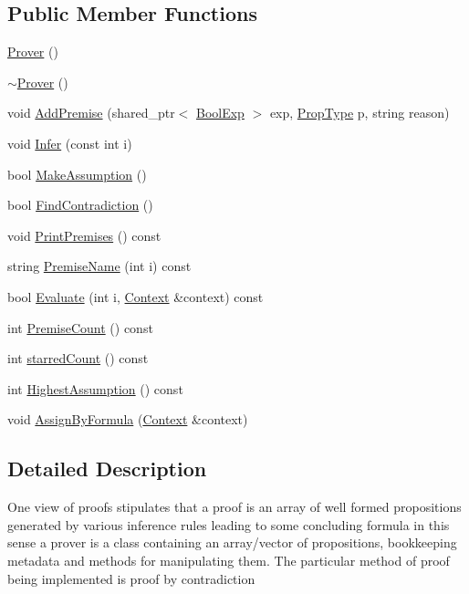 \subsection*{Public Member Functions}
\begin{DoxyCompactItemize}
\item 
\mbox{\hyperlink{classProver_a53e01b8533298b61a5b7f7abf641df32}{Prover}} ()
\item 
\mbox{\hyperlink{classProver_a3bf49b1519cdec0eca3c22ebfe23fbde}{$\sim$\+Prover}} ()
\item 
void \mbox{\hyperlink{classProver_aa861628e3d89e9cd634b18aaacc99e58}{Add\+Premise}} (shared\+\_\+ptr$<$ \mbox{\hyperlink{classBoolExp}{Bool\+Exp}} $>$ exp, \mbox{\hyperlink{boolexp_8h_ac6a79184a0a7c1d2e3ea745512aa2d0c}{Prop\+Type}} p, string reason)
\item 
void \mbox{\hyperlink{classProver_a40376d5e8cc820b45b073dcc9320ed36}{Infer}} (const int i)
\item 
bool \mbox{\hyperlink{classProver_a046549fd07af6d0315a1d0df93215c60}{Make\+Assumption}} ()
\item 
bool \mbox{\hyperlink{classProver_a347682708b1a198c35d7609022ce4dd9}{Find\+Contradiction}} ()
\item 
void \mbox{\hyperlink{classProver_aecc46e8d5521ff62e283755fb44b68e2}{Print\+Premises}} () const
\item 
string \mbox{\hyperlink{classProver_aaf06243b77406aa09ff55e59eec448f3}{Premise\+Name}} (int i) const
\item 
bool \mbox{\hyperlink{classProver_af58f19171272472ab438b144e942c0dd}{Evaluate}} (int i, \mbox{\hyperlink{classContext}{Context}} \&context) const
\item 
int \mbox{\hyperlink{classProver_ab33b18bf4e9c3ea6a3dd48e47e90e5ef}{Premise\+Count}} () const
\item 
int \mbox{\hyperlink{classProver_a21743acd96dd9b8bf26ee02ea8761d88}{starred\+Count}} () const
\item 
int \mbox{\hyperlink{classProver_a98c85ede3242c56e7f7e7f3b42bbd191}{Highest\+Assumption}} () const
\item 
void \mbox{\hyperlink{classProver_a3d4b890f7c8eefb9788e4bd545ea0c0e}{Assign\+By\+Formula}} (\mbox{\hyperlink{classContext}{Context}} \&context)
\end{DoxyCompactItemize}


\subsection{Detailed Description}
One view of proofs stipulates that a proof is an array of well formed propositions generated by various inference rules leading to some concluding formula in this sense a prover is a class containing an array/vector of propositions, bookkeeping metadata and methods for manipulating them. The particular method of proof being implemented is proof by contradiction 

